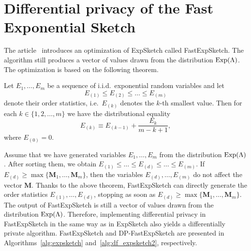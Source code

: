 \section{Differential privacy of the Fast Exponential Sketch}

The article~\cite{Eficient_framework_for_operating_on_data_sketches} introduces an optimization of ExpSketch called FastExpSketch. The algorithm still produces a vector of values drawn from the distribution $\operatorname{Exp}(\Lambda)$. The optimization is based on the following theorem.

\begin{theorem}
Let $E_1, \ldots, E_m$ be a sequence of i.i.d.\ exponential random variables and let
\[
E_{(1)} \leq E_{(2)} \leq \ldots \leq E_{(m)}
\]
denote their order statistics, i.e.\ $E_{(k)}$ denotes the $k$-th smallest value. Then for each $k \in \{1, 2, \ldots, m\}$ we have the distributional equality
\[
E_{(k)} \equiv E_{(k - 1)} + \frac{E_k}{m - k + 1},
\]
where $E_{(0)} = 0$.
\end{theorem}

Assume that we have generated variables $E_1, \ldots, E_m$ from the distribution $\operatorname{Exp}(\Lambda)$. After sorting them, we obtain $E_{(1)} \leq \ldots \leq E_{(d)} \leq \ldots \leq E_{(m)}$. If $E_{(d)} \geq \max\{\mathbf{M}_1, \ldots, \mathbf{M}_m\}$, then the variables $E_{(d)}, \ldots, E_{(m)}$ do not affect the vector $\mathbf{M}$. Thanks to the above theorem, FastExpSketch can directly generate the order statistics $E_{(1)}, \ldots, E_{(d)}$, stopping as soon as $E_{(d)} \geq \max\{\mathbf{M}_1, \ldots, \mathbf{M}_m\}$. The output of FastExpSketch is still a vector of values drawn from the distribution $\operatorname{Exp}(\Lambda)$. Therefore, implementing differential privacy in FastExpSketch in the same way as in ExpSketch also yields a differentially private algorithm. FastExpSketch and DP-FastExpSketch are presented in Algorithms~\ref{alg:expsketch} and~\ref{alg:df_expsketch2}, respectively.

